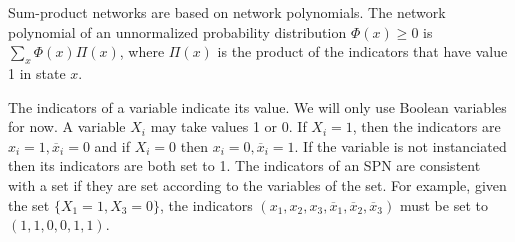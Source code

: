 \documentclass[a4paper,10pt]{article}
\theoremstyle{plain}
\begin{document}
\begin{figure}[h]
  \captionsetup{justification=centering}
\end{figure}

Sum-product networks are based on network polynomials. The network polynomial of an unnormalized
probability distribution $\Phi(x)\geq 0$ is $\sum_x \Phi(x)\Pi(x)$, where $\Pi(x)$ is the product
of the indicators that have value 1 in state $x$.

The indicators of a variable indicate its value. We will only use Boolean variables for now. A
variable $X_i$ may take values 1 or 0. If $X_i=1$, then the indicators are $x_i=1,\overline{x}_i=0$
and if $X_i=0$ then $x_i=0,\overline{x}_i=1$. If the variable is not instanciated then its
indicators are both set to 1. The indicators of an SPN are consistent with a set if they are set
according to the variables of the set. For example, given the set $\{X_1=1,X_3=0\}$, the indicators
$(x_1,x_2,x_3,\overline{x}_1,\overline{x}_2,\overline{x}_3)$ must be set to $(1,1,0,0,1,1)$.
\end{document}
